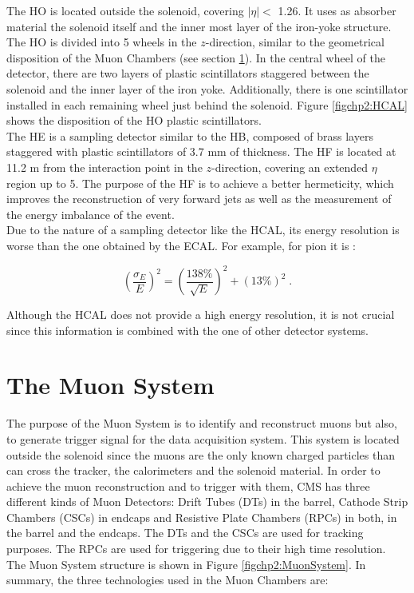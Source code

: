 \noindent The HO is located outside the solenoid, covering $|\eta| < $ 1.26. It uses as absorber 
material the solenoid itself and the inner most layer of the iron-yoke structure. The HO 
is divided into 5 wheels in the $z$-direction, similar to the geometrical disposition 
of the Muon Chambers (see section \ref{sec:MuonSys}). In the central wheel of the detector, there 
are two layers of plastic scintillators staggered between the solenoid and the inner 
layer of the iron yoke. Additionally, there is one scintillator installed in 
each remaining wheel just behind the solenoid. Figure \ref{figchp2:HCAL} shows the disposition of 
the HO plastic scintillators. \\

\noindent The HE is a sampling detector similar to the HB, composed of brass layers 
staggered with plastic scintillators of 3.7 mm of thickness. The HF 
is located at 11.2 m from the interaction point in the $z$-direction,
covering an extended $\eta$ region up to 5. The purpose of the HF is 
to achieve a better hermeticity, which improves the reconstruction of very forward 
jets as well as the measurement of the energy imbalance of the event. \\

\noindent Due to the nature of a sampling detector like the HCAL, its energy resolution 
is worse than the one obtained by the ECAL. For example, for pion it is \cite{chp2:CMS}:

\begin{equation} \label{ECALenergyResolution}
 \left(\frac{\sigma_{E}}{E}\right)^{2} = \left(\frac{138\%}{\sqrt{E}}\right)^{2} + \left(13\% \right)^{2} \;.
\end{equation}

\noindent Although the HCAL does not provide a high energy resolution, it is not crucial
since this information is combined with the one of other detector systems.

\section{The Muon System}
\label{sec:MuonSys}

\noindent The purpose of the Muon System is to identify and reconstruct muons but also,
to generate trigger signal for the data acquisition system. This system
is located outside the solenoid since the muons are the only known charged particles 
than can cross the tracker, the calorimeters and the solenoid material. In order to achieve the
muon reconstruction and to trigger with them, CMS has three different kinds of 
Muon Detectors: Drift Tubes (DTs) in the barrel, Cathode Strip Chambers (CSCs) in endcaps and Resistive 
Plate Chambers (RPCs) in both, in the barrel and the endcaps. The DTs and the CSCs are used for tracking 
purposes. The RPCs are used for triggering due to their high time 
resolution. The Muon System structure is shown in Figure \ref{figchp2:MuonSystem}. In summary, 
the three technologies used in the Muon Chambers are:

